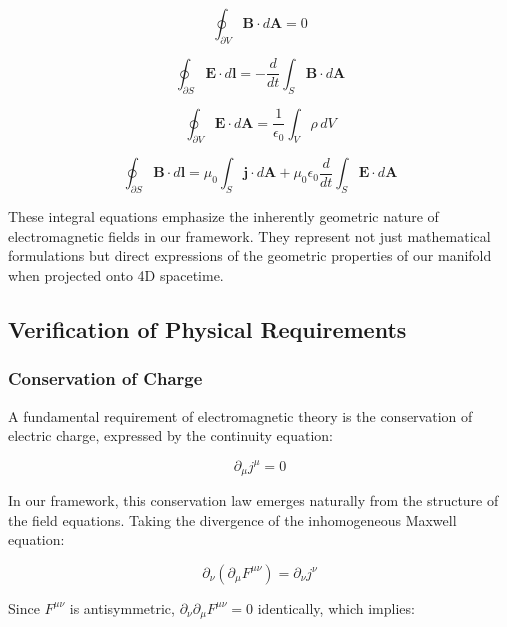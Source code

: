 \documentclass{article}
\begin{document}
\begin{equation}
\oint_{\partial V} \mathbf{B} \cdot d\mathbf{A} = 0
\end{equation}

\begin{equation}
\oint_{\partial S} \mathbf{E} \cdot d\mathbf{l} = -\frac{d}{dt}\int_{S} \mathbf{B} \cdot d\mathbf{A}
\end{equation}

\begin{equation}
\oint_{\partial V} \mathbf{E} \cdot d\mathbf{A} = \frac{1}{\epsilon_0}\int_{V} \rho \, dV
\end{equation}

\begin{equation}
\oint_{\partial S} \mathbf{B} \cdot d\mathbf{l} = \mu_0\int_{S} \mathbf{j} \cdot d\mathbf{A} + \mu_0\epsilon_0\frac{d}{dt}\int_{S} \mathbf{E} \cdot d\mathbf{A}
\end{equation}

These integral equations emphasize the inherently geometric nature of electromagnetic fields in our framework. They represent not just mathematical formulations but direct expressions of the geometric properties of our manifold when projected onto 4D spacetime.

\subsection{Verification of Physical Requirements}

\subsubsection{Conservation of Charge}

A fundamental requirement of electromagnetic theory is the conservation of electric charge, expressed by the continuity equation:

\begin{equation}
\partial_{\mu}j^{\mu} = 0
\end{equation}

In our framework, this conservation law emerges naturally from the structure of the field equations. Taking the divergence of the inhomogeneous Maxwell equation:

\begin{equation}
\partial_{\nu}(\partial_{\mu}F^{\mu\nu}) = \partial_{\nu}j^{\nu}
\end{equation}

Since $F^{\mu\nu}$ is antisymmetric, $\partial_{\nu}\partial_{\mu}F^{\mu\nu} = 0$ identically, which implies:
\end{document}
